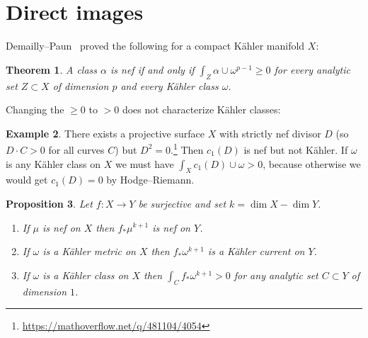 \documentclass[11pt]{amsart}
\newtheorem{theo}{Theorem}
\newtheorem{prop}[theo]{Proposition}
\theoremstyle{definition}
\newtheorem{exam}[theo]{Example}
\begin{document}
\section{Direct images}

Demailly--Paun~\cite[Theorem 4.5(iii)]{demailly2004numerical} proved the following for a compact K\"ahler manifold $X$:

\begin{theo}
A class $\alpha$ is nef if and only if $\int_Z \alpha \cup \omega^{p-1} \geq 0$ for every analytic set $Z \subset X$ of dimension $p$ and every K\"ahler class $\omega$.
\end{theo}

Changing the $\geq 0$ to $> 0$ does not characterize K\"ahler classes:

\begin{exam}
There exists a projective surface $X$ with strictly nef divisor $D$ (so $D \cdot C > 0$ for all curves $C$) but $D^2 = 0$.\footnote{\url{https://mathoverflow.net/q/481104/4054}}
Then $c_1(D)$ is nef but not K\"ahler.
If $\omega$ is any K\"ahler class on $X$ we must have $\int_X c_1(D) \cup \omega > 0$, because otherwise we would get $c_1(D) = 0$ by Hodge--Riemann.
\end{exam}





\begin{prop}
Let $f : X \to Y$ be surjective and set $k = \dim X - \dim Y$.
\begin{enumerate}
\item
If $\mu$ is nef on $X$ then $f_* \mu^{k+1}$ is nef on $Y$.

\item
If $\omega$ is a K\"ahler metric on $X$ then $f_*\omega^{k+1}$ is a K\"ahler current on $Y$.

\item
If $\omega$ is a K\"ahler class on $X$ then $\int_C f_*\omega^{k+1} > 0$ for any analytic set $C \subset Y$ of dimension $1$.
\end{enumerate}
\end{prop}
\end{document}
